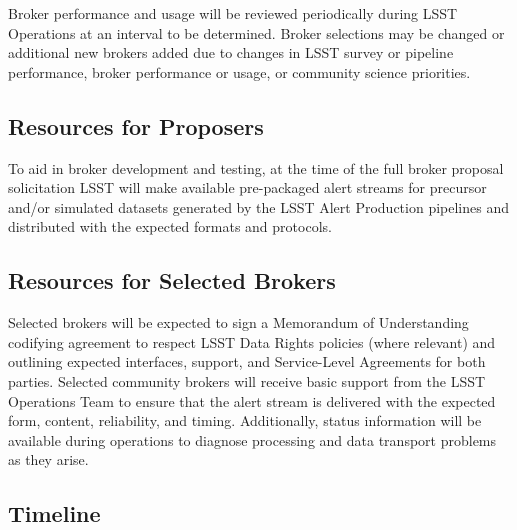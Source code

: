 Broker performance and usage will be reviewed periodically during LSST Operations at an interval to be determined.
Broker selections may be changed or additional new brokers added due to changes in LSST survey or pipeline performance, broker performance or usage, or community science priorities.

\subsection{Resources for Proposers}

To aid in broker development and testing, at the time of the full broker proposal solicitation LSST will make available pre-packaged alert streams for precursor and/or simulated datasets generated by the LSST Alert Production pipelines and distributed with the expected formats and protocols.

\subsection{Resources for Selected Brokers}

Selected brokers will be expected to sign a Memorandum of Understanding codifying agreement to respect LSST Data Rights policies (where relevant) and outlining expected interfaces, support, and Service-Level Agreements for both parties.
Selected community brokers will receive basic support from the LSST Operations Team to ensure that the alert stream is delivered with the expected form, content, reliability, and timing.
Additionally, status information will be available during operations to diagnose processing and data transport problems as they arise.

\subsection{Timeline}

